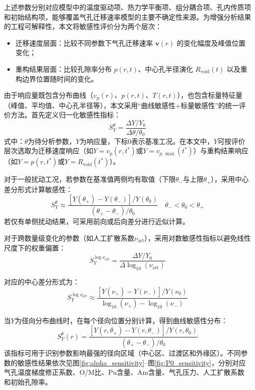 上述参数分别对应模型中的温度驱动项、热力学平衡项、组分耦合项、孔内传质项和初始结构项，能够覆盖气孔迁移速率模型的主要不确定性来源。为增强分析结果的工程可解释性，本文将敏感性评价分为两个层次：
\begin{itemize}
	\item 迁移速度层面：比较不同参数下气孔迁移速率 $\boldsymbol{v}(r)$ 的变化幅度及峰值位置变化；
	\item 重构结果层面：比较孔隙率分布 $p(r,t)$、中心孔半径演化 $R_{\mathrm{void}}(t)$ 以及重构边界位置随时间的变化。
\end{itemize}

由于响应量既包含分布曲线（$v_{\mathrm p}(r)$、$p(r,t)$、$T(r,t)$），也包含标量特征量（峰值、平均值、中心孔半径等），本文采用“曲线敏感性+标量敏感性”的统一评价方法。首先定义归一化敏感性指标：
\begin{equation}
	S_Y^\theta = \frac{\Delta Y / Y_0}{\Delta \theta / \theta_0}
	\label{eq:sensitivity_definition}
\end{equation}
\noindent 式中：$\theta$为待分析参数，$Y$为响应量，下标$0$表示基准工况。在本文中，$Y$可按评价层次选取为迁移速度响应（如$Y=v_{\mathrm p}(r,t^*)$或$Y=v_{p,\max}(t^*)$）与重构结果响应（如$Y=p(r,t^*)$或$Y=R_{\mathrm{void}}(t^*)$）。

对于一般扰动工况，若参数在基准值两侧均有取值（下限$\theta_-$与上限$\theta_+$），采用中心差分形式计算敏感性：
\begin{equation}
	S_Y^{\theta}\approx
	\frac{\left[Y(\theta_+)-Y(\theta_-)\right]/Y(\theta_0)}{\left(\theta_+-\theta_-\right)/\theta_0}
	\quad \theta_-<\theta_0<\theta_+
\end{equation}
若仅有单侧扰动结果，可采用前向或后向差分进行近似计算。

对于跨数量级变化的参数（如人工扩散系数$\nu_{\mathrm{art}}$），采用对数敏感性指标以避免线性尺度下的权重偏置：
\begin{equation}
	S_Y^{\log \nu_{\mathrm{art}}}=
	\frac{\Delta Y/Y_0}{\Delta \log_{10}(\nu_{\mathrm{art}})}
\end{equation}

对应的中心差分形式为：
\begin{equation}
	S_Y^{\log \nu_{\mathrm{art}}}\approx
	\frac{\left[Y(\nu_+)-Y(\nu_-)\right]/Y(\nu_0)}{\log_{10}(\nu_+)-\log_{10}(\nu_-)}
\end{equation}

当$Y$为径向分布曲线时，在每个径向位置分别计算，得到曲线敏感性分布：
\begin{equation}
	S_Y^{\theta}(r)=
	\frac{\left[Y(r,\theta_+)-Y(r,\theta_-)\right]/Y(r,\theta_0)}{\left(\theta_+-\theta_-\right)/\theta_0}
\end{equation}
该指标可用于识别参数影响最强的径向区域（中心区、过渡区和外缘区）。不同参数的敏感性结果依次见图\ref{fig:alpha_sensitivity}--图\ref{fig:P0_sensitivity}，分别对应气孔温度梯度修正系数、O/M比、Pu含量、Am含量、气孔压力、人工扩散系数和初始孔隙率。

